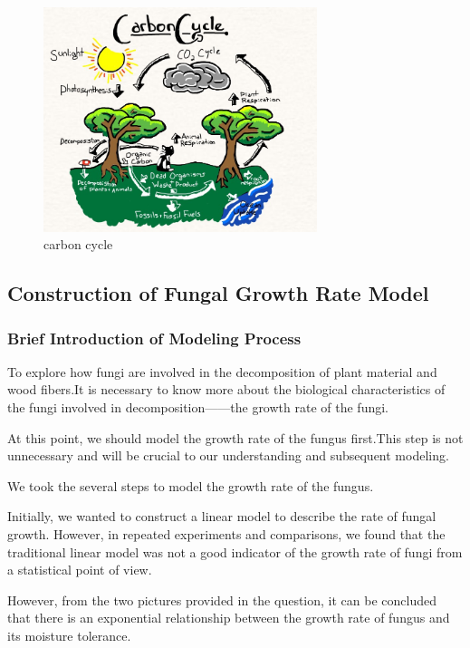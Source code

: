 \documentclass[12pt]{article}
\begin{document}
\begin{figure}[h] %
\centering
\includegraphics[width=8cm]{carboncycle.jpg}
\caption{carbon cycle \protect\footnotemark}
\end{figure}


\subsection{Construction of Fungal Growth Rate Model}
\subsubsection{Brief Introduction of Modeling Process}
To explore how fungi are involved in the decomposition of plant material and wood fibers.It is necessary to know more about the biological characteristics of the fungi involved in decomposition——the growth rate of the fungi. \par 

At this point, we should model the growth rate of the fungus first.This step is not unnecessary and will be crucial to our understanding and subsequent modeling.\par 

We took the several steps to model the growth rate of the fungus.\par 

Initially, we wanted to construct a linear model to describe the rate of fungal growth. However, in repeated experiments and comparisons, we found that the traditional linear model was not a good indicator of the growth rate of fungi from a statistical point of view. \par 

However, from the two pictures provided in the question, it can be concluded that there is an exponential relationship between the growth rate of fungus and its moisture tolerance. \par 
\end{document}
